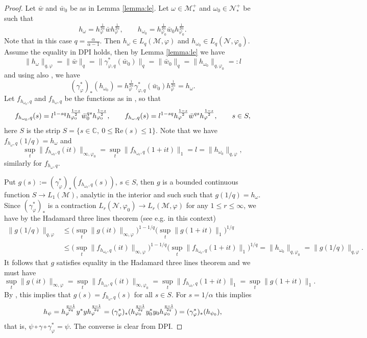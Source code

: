 \documentclass[12pt]{article}
\theoremstyle{definition}
\theoremstyle{remark}
\def\Me{\mathcal M}
\def\Ne{\mathcal N}
\def\ffi{\varphi}
\begin{document}
\begin{proof} Let $\bar w$ and $\bar w_0$ be as in Lemma \ref{lemma:le}. Let $\omega\in
\Me_*^+$ and $\omega_0\in \Ne_*^+$ be such that
\[
h_\omega=h_\ffi^{\frac1{2\alpha}}\bar wh_\ffi^{\frac1{2\alpha}},\qquad
h_{\omega_0}=h_{\ffi_0}^{\frac1{2\alpha}}\bar w_0h_{\ffi_0}^{\frac1{2\alpha}}.
\]
Note that in this
case $q=\tfrac{\alpha}{\alpha-1}$. Then $h_\omega\in L_q(\Me,\ffi)$ and $h_{\omega_0}\in
L_q(\Ne,\ffi_0)$. Assume the equality in DPI holds, then by Lemma
\ref{lemma:le} we have
\[
\|h_\omega\|_{q,\ffi}=\|\bar w\|_q=\|\gamma^*_{\ffi,q}(\bar
w_0)\|_q=\|\bar w_0\|_q=\|h_{\omega_0}\|_{q,\ffi_0}=:l
\]
and using also \cite[Lemma 3.1]{hiai2024ontheproperties}, we have
\[
(\gamma^*_\ffi)_*(h_{\omega_0})=h_\ffi^{\frac1{2\alpha}}\gamma^*_{\ffi,q}(\bar
w_0)h_\ffi^{\frac1{2\alpha}}=h_\omega.
\]
Let $f_{h_{\omega_0},q}$ and $f_{h_\omega,q}$ be the functions as in \cite[Eq.
(9)]{jencova2018renyi}, so that
\[
f_{h_{\omega_0},q}(s)=l^{1-sq}h_{\ffi_0}^{1-s\over 2}\bar w_0^{qs}h_{\ffi_0}^{1-s\over 2},
\qquad f_{h_\omega,q}(s)=l^{1-sq}h_{\ffi}^{1-s\over 2}\bar w^{qs}h_{\ffi}^{1-s\over 2}, \qquad s\in
S,
\]
here $S$ is the strip $S=\{s\in \mathbb C,\ 0\le \mathrm{Re}(s)\le 1\}$. Note that we have
$f_{h_\omega,q}(1/q)=h_\omega$ and 
\[
\sup_t\|f_{h_{\omega_0},q}(it)\|_{\infty,\ffi_0}=
\sup_t\|f_{h_{\omega_0},q}(1+it)\|_{1}=l=\|h_{\omega_0}\|_{q,\ffi},
\]
similarly for $f_{h_{\omega},q}$. 


Put $g(s):=(\gamma^*_\ffi)_*(f_{h_{\omega_0},q}(s))$, $s\in S$, then $g$ is a bounded continuous
function $S\to L_1(\Me)$, analytic in the interior and such  such that $g(1/q)=h_\omega$.
Since $(\gamma^*_\ffi)_*$ is a contraction 
$L_r(\Ne,\ffi_0)\to L_r(\Me,\ffi)$ for any $1\le r\le \infty$, we have by the Hadamard
three lines theorem (see e.g. \cite[Thm. 2.10]{jencova2018renyi} in this context) 
\begin{align*}
\|g(1/q)\|_{q,\ffi}&\le
\bigl(\sup_t\|g(it)\|_{\infty,\ffi}\bigr)^{1-1/q}\bigl(\sup_t\|g(1+it)\|_{1}\bigr)^{1/q}\\
&\le
\bigl(\sup_t\|f_{h_{\omega_0},q}(it)\|_{\infty,\ffi}\bigr)^{1-1/q}\bigl(\sup_t\|f_{h_{\omega_0},q}(1+it)\|_{1}\bigr)^{1/q}
=\|h_{\omega_0}\|_{q,\ffi_0}=\|g(1/q)\|_{q,\ffi}.
\end{align*}
It follows that $g$ satisfies equality in the Hadamard three lines theorem and we must
have
\[
\sup_t\|g(it)\|_{\infty,\ffi}=\sup_t\|f_{h_{\omega_0},q}(it)\|_{\infty,\ffi_0}=
\sup_t\|f_{h_{\omega_0},q}(1+it)\|_{1}=\sup_t\|g(1+it)\|_{1}.
\]
By \cite[Thm. 2.10]{jencova2018renyi}, this  implies that $g(s)=f_{h_\omega,q}(s)$
for all $s\in S$. For $s=1/\alpha$ this implies
\[
h_\psi=h_\ffi^{q-1\over 2q}y^*yh_\ffi^{q-1\over 2q}=(\gamma^*_\ffi)_*(h_{\ffi_0}^{q-1\over
2q}y_0^*y_0h_{\ffi_0}^{q-1\over 2q})=(\gamma^*_\ffi)_*(h_{\psi_0}),
\]
that is, $\psi\circ\gamma\circ\gamma^*_\ffi=\psi$. The converse is clear from DPI.

\end{proof}
\end{document}
